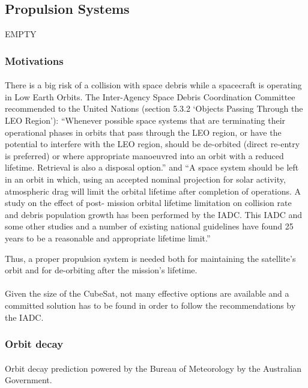\subsection{Propulsion Systems}

EMPTY

\subsubsection{Motivations}
\paragraph{}There is a big risk of a collision with space debris while a spacecraft is operating in Low Earth Orbits. The Inter-Agency Space Debris Coordination Committee recommended to the United Nations (section 5.3.2 ‘Objects Passing Through the LEO Region’): “Whenever possible space systems that are terminating their operational phases in orbits that pass through the LEO region, or have the potential to interfere with the LEO region, should be de-orbited (direct re-entry is preferred) or where appropriate manoeuvred into an orbit with a reduced lifetime. Retrieval is also a disposal option.” and “A space system should be left in an orbit in which, using an accepted nominal projection for solar activity, atmospheric drag will limit the orbital lifetime after completion of operations. A study on the effect of post- mission orbital lifetime limitation on collision rate and debris population growth has been performed by the IADC. This IADC and some other studies and a number of existing national guidelines have found 25 years to be a reasonable and appropriate lifetime limit.”

Thus, a proper propulsion system is needed both for maintaining the satellite's orbit and for de-orbiting after the mission's lifetime.

\paragraph{}Given the size of the CubeSat, not many effective options are available and a committed solution has to be found in order to follow the recommendations by the IADC.

\subsubsection{Orbit decay}

\paragraph{}Orbit decay prediction powered by the Bureau of Meteorology by the Australian Government.

